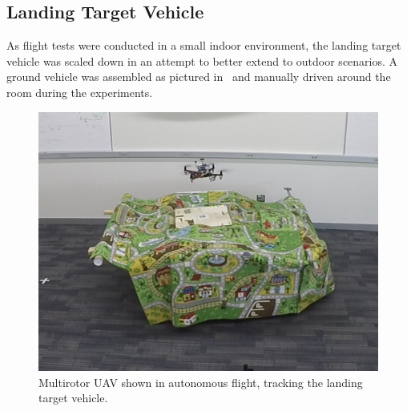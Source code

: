 
\subsection{Landing Target Vehicle}
As flight tests were conducted in a small indoor environment, the landing target
vehicle was scaled down in an attempt to better extend to outdoor scenarios. A
ground vehicle was assembled as pictured in~
and manually driven around the
room during the experiments.

\begin{figure}
  \centering
  \includegraphics[scale=0.5]{imgs/landing_vehicle.png}
  \caption[UAV Tracking the Target Vehicle During Flight Experiment]{Multirotor
    UAV shown in autonomous flight, tracking the landing target
  vehicle.}
  \label{fig:landing_vehicle}
\end{figure}
